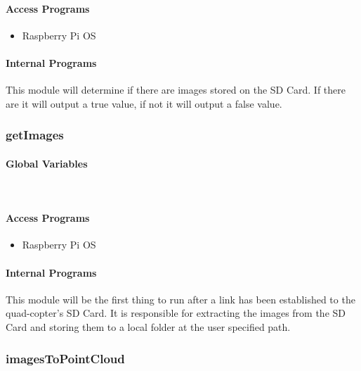 \documentclass[10pt,letterpaper]{article}
\begin{document}
\paragraph{Access Programs}
\begin{itemize}
\item Raspberry Pi OS
\end{itemize}
\paragraph{Internal Programs}
This module will determine if there are images stored on the SD Card. If there are it will output a true value, if not it will output a false value.


\subsubsection{getImages}

\paragraph{Global Variables}
~
\begin{table}[H]
  \caption{getImages}
\end{table}

\paragraph{Access Programs}
\begin{itemize}
\item Raspberry Pi OS
\end{itemize}

\paragraph{Internal Programs}
This module will be the first thing to run after a link has been established to the quad-copter's SD Card. It is responsible for extracting the images from the SD Card and storing them to a local folder at the user specified path.

\subsubsection{imagesToPointCloud}
\end{document}
